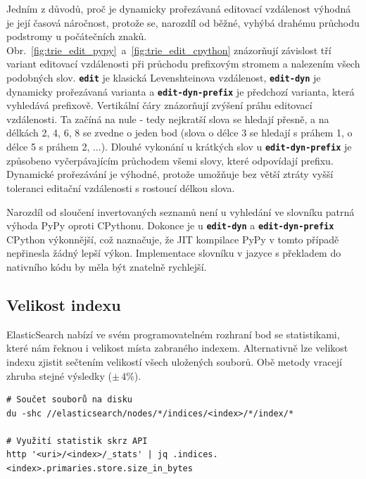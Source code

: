 \documentclass[11pt,letterpaper,oneside,openright]{book}
\newcommand{\bftt}[1]{\texttt{\textbf{#1}}}
\begin{document}
Jedním z důvodů, proč je dynamicky prořezávaná editovací vzdálenost výhodná je
její časová náročnost, protože se, narozdíl od běžné, vyhýbá drahému průchodu
podstromy u počátečních znaků.
Obr.~\ref{fig:trie_edit_pypy}~a~\ref{fig:trie_edit_cpython} znázorňují
závislost tří variant editovací vzdálenosti při průchodu prefixovým stromem a
nalezením všech podobných slov. \bftt{edit} je klasická Levenshteinova
vzdálenost, \bftt{edit-dyn} je dynamicky prořezávaná varianta a
\bftt{edit-dyn-prefix} je předchozí varianta, která vyhledává prefixově.
Vertikální čáry znázorňují zvýšení práhu editovací vzdálenosti. Ta začíná na
nule - tedy nejkratší slova se hledají přesně, a na délkách 2, 4, 6, 8 se
zvedne o jeden bod (slova o délce 3 se hledají s práhem 1, o délce 5 s práhem
2, ...). Dlouhé vykonání u krátkých slov u \bftt{edit-dyn-prefix} je způsobeno
vyčerpávajícím průchodem všemi slovy, které odpovídají prefixu. Dynamické
prořezávání je výhodné, protože umožňuje bez větší ztráty vyšší toleranci
editační vzdálenosti s rostoucí délkou slova.

Narozdíl od sloučení invertovaných seznamů není u vyhledání ve slovníku patrná
výhoda PyPy oproti CPythonu. Dokonce je u \bftt{edit-dyn} a
\bftt{edit-dyn-prefix} CPython výkonnější, což naznačuje, že JIT kompilace PyPy
v tomto případě nepřinesla žádný lepší výkon. Implementace slovníku v jazyce s
překladem do nativního kódu by měla být znatelně rychlejší.



\newpage
\subsection{Velikost indexu}
ElasticSearch nabízí ve svém programovatelném rozhraní bod se statistikami,
které nám řeknou i velikost místa zabraného indexem. Alternativně lze velikost
indexu zjistit sečtením velikostí všech uložených souborů. Obě metody vracejí
zhruba stejné výsledky ($\pm\,4\%$).

\begin{Verbatim}
# Součet souborů na disku
du -shc //elasticsearch/nodes/*/indices/<index>/*/index/*

# Využití statistik skrz API
http '<uri>/<index>/_stats' | jq .indices.<index>.primaries.store.size_in_bytes
\end{Verbatim}
\end{document}
